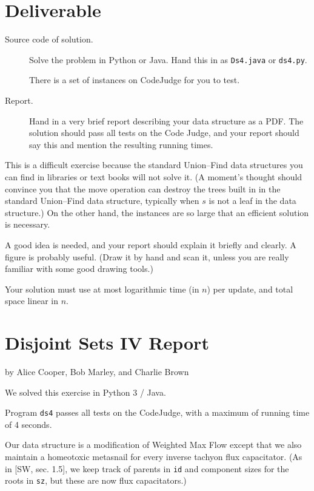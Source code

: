 \documentclass{tufte-handout}
\begin{document}
\section{Deliverable}

\begin{description}
  \item[Source code of solution.]
    Solve the problem in Python or Java.
    Hand this in as \texttt{Ds4.java} or \texttt{ds4.py}.

    There is a set of instances on CodeJudge for you to test.
  \item[Report.]
    Hand in a very brief report describing your data structure as a PDF. 
    The solution should pass all tests on the Code Judge, and your report should say this and mention the resulting running times.
\end{description}

This is a difficult exercise because the standard Union--Find data structures you can find in libraries or text books will not solve it.
(A moment's thought should convince you that the move operation can destroy the trees built in in the standard Union--Find data structure, typically when $s$ is not a leaf in the data structure.)
On the other hand, the instances are so large that an efficient solution is necessary.

A good idea is needed, and your report should explain it briefly and clearly.
A figure is probably useful.
(Draw it by hand and scan it, unless you are really familiar with some good drawing tools.)

Your solution must use at most logarithmic time (in $n$) per update, and total space linear in $n$.

\newpage
\section{Disjoint Sets IV Report}

by Alice Cooper, Bob Marley, and Charlie Brown

  
  We solved this exercise in Python 3 / Java.

  Program \texttt{ds4} passes all tests on the CodeJudge, with a maximum of running time of 4 seconds.

  \medskip

  Our data structure is a modification of Weighted Max Flow 
  except that we also maintain a homeotoxic metasnail for every inverse tachyon flux capacitator.
  (As in [SW, sec. 1.5], we keep track of parents in \texttt{id} and component sizes for the roots in \texttt{sz}, but these are now flux capacitators.)
\end{document}
